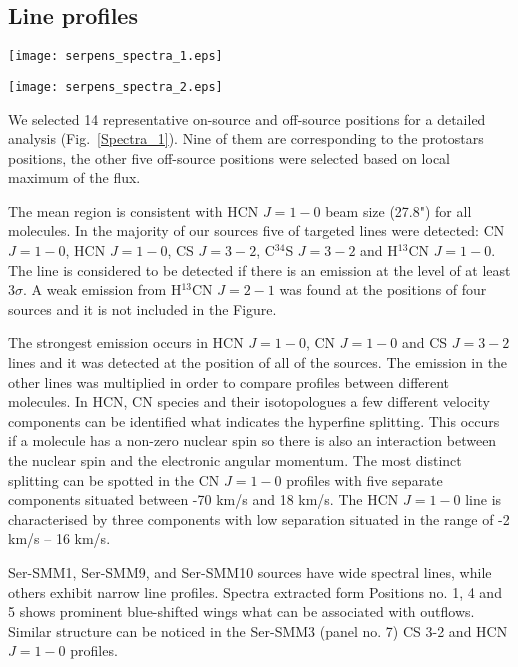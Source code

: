 \documentclass{aa}
\begin{document}
\subsection{Line profiles}

\begin{figure*}
   \centering
   \texttt{[image: serpens\_spectra\_1.eps]}
         \label{Spectra_1}
   \end{figure*}
\begin{figure*}
   \centering
   \texttt{[image: serpens\_spectra\_2.eps]}
      \caption{Serpens Main sources spectra of C$^{34}$S $J=3-2$, CS $J=3-2$, H$^{13}$CN $J=1-0$, HCN $J=1-0$ and CN $J=1-0$ lines.}
         \label{Spectra_1}
   \end{figure*}

We selected 14 representative on-source and off-source positions for a detailed analysis (Fig.~\ref{Spectra_1}). Nine of them are corresponding to the protostars positions, the other five off-source positions were selected based on local maximum of the flux.   

The mean region is consistent with HCN $J=1-0$ beam size (27.8") for all molecules. In the majority of our sources five of targeted lines were detected: CN $J=1-0$, HCN $J=1-0$, CS $J=3-2$, C$^{34}$S $J=3-2$ and H$^{13}$CN $J=1-0$. The line is considered to be detected if there is an emission at the level of at least 3$\sigma$. A weak emission from H$^{13}$CN $J=2-1$ was found at the positions of four sources and it is not included in the Figure. 

The strongest emission occurs in HCN $J=1-0$, CN $J=1-0$ and CS $J=3-2$ lines and it was detected at the position of all of the sources. The emission in the other lines was multiplied in order to compare profiles between different molecules. In HCN, CN species and their isotopologues a few different velocity components can be identified what indicates the hyperfine splitting. This occurs if a molecule has a non-zero nuclear spin so there is also an interaction between the nuclear spin and the electronic angular momentum. The most distinct splitting can be spotted in the CN $J=1-0$ profiles with five separate components situated between -70 km/s and 18 km/s. The HCN $J=1-0$ line is characterised by three components with low separation situated in the range of -2 km/s – 16 km/s. 

Ser-SMM1, Ser-SMM9, and Ser-SMM10 sources have wide spectral lines, while others exhibit narrow line profiles. Spectra extracted form Positions no. 1, 4 and 5 shows prominent blue-shifted wings what can be associated with outflows. Similar structure can be noticed in the Ser-SMM3 (panel no. 7) CS 3-2 and HCN $J=1-0$ profiles. 
\end{document}
